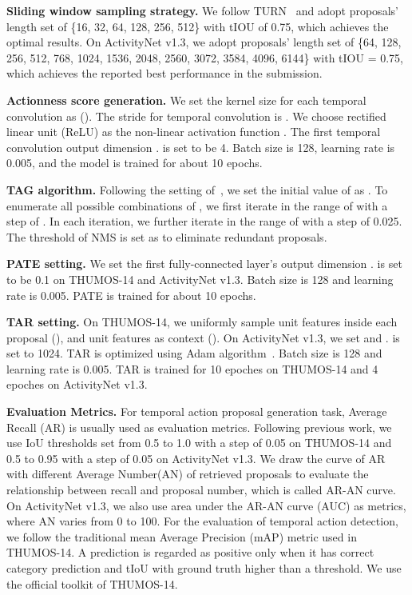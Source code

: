 \documentclass[runningheads]{llncs}
\begin{document}
\textbf{Sliding window sampling strategy.} We follow TURN~\cite{Gao_2017_ICCV} and adopt proposals' length set of \{16, 32, 64, 128, 256, 512\} with tIOU of 0.75, which achieves the optimal results. On ActivityNet v1.3, we adopt proposals' length set of \{64, 128, 256, 512, 768, 1024, 1536, 2048, 2560, 3072, 3584, 4096, 6144\} with tIOU = 0.75, which achieves the reported best performance in the submission.

\textbf{Actionness score generation.} We set the kernel size for each temporal convolution as  (). The stride for temporal convolution is . We choose rectified linear unit (ReLU) as the non-linear activation function . The first temporal convolution output dimension .  is set to be 4. Batch size is 128, learning rate is 0.005, and the model is trained for about 10 epochs. 

\textbf{TAG algorithm.} Following the setting of~\cite{Zhao_2017_ICCV}, we set the initial value of  as . To enumerate all possible combinations of , we first iterate  in the range of  with a step of . In each iteration, we further iterate  in the range of  with a step of 0.025. 
The threshold of NMS is set as  to eliminate redundant proposals.

\textbf{PATE setting.} We set the first fully-connected layer's output dimension .  is set to be 0.1 on THUMOS-14 and ActivityNet v1.3. Batch size is 128 and learning rate is 0.005. PATE is trained for about 10 epochs.

\textbf{TAR setting.} On THUMOS-14, we uniformly sample  unit features inside each proposal (), and  unit features as context (). 
On ActivityNet v1.3, we set  and .  is set to 1024.
TAR is optimized using Adam algorithm~\cite{kingma2014adam}. Batch size is 128 and learning rate is 0.005. TAR is trained for 10 epoches on THUMOS-14 and 4 epoches on ActivityNet v1.3.

\textbf{Evaluation Metrics.} For temporal action proposal generation task, Average Recall (AR) is usually used as evaluation metrics. Following previous work, we use IoU thresholds set from 0.5 to 1.0 with a step of 0.05 on THUMOS-14 and 0.5 to 0.95 with a step of 0.05 on ActivityNet v1.3. We draw the curve of AR with different Average Number(AN) of retrieved proposals to evaluate the relationship between recall and proposal number, which is called AR-AN curve. On ActivityNet v1.3, we also use area under the AR-AN curve (AUC) as metrics, where AN varies from 0 to 100. 
For the evaluation of temporal action detection, we follow the traditional mean Average Precision (mAP) metric
used in THUMOS-14. A prediction is regarded as positive only when it has correct category prediction and tIoU with ground truth higher than a threshold. We use the official toolkit of THUMOS-14.
\end{document}
